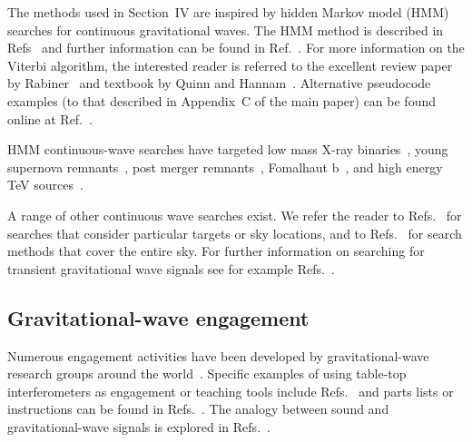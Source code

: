 \documentclass[aps,pra,superscriptaddress,reprint]{revtex4-2}
\begin{document}
The methods used in Section~IV are inspired by hidden Markov model (HMM) searches for continuous gravitational waves. 
The HMM method is described in Refs~\cite{SuvorovaEtAl:2017,SuvorovaEtAl:2016,BayleyEtAlSOAP:2019,Viterbi:1967} and further information can be found in Ref.~\cite{JKS:1998}. 
For more information on the Viterbi algorithm, the interested reader is referred to the excellent review paper by Rabiner~\cite{Rabiner:1989} and textbook by Quinn and Hannam~\cite{QuinnEtAl:2001}. 
Alternative pseudocode examples (to that described in Appendix~C of the main paper) can be found online at Ref.~\cite{viterbipseudocode:online}.

HMM continuous-wave searches have targeted low mass X-ray binaries~\cite{ScoX1O2Viterbi:2019, ScoX1ViterbiO1:2017,MiddletonEtAlO2LMXBs:2020}, young supernova remnants~\cite{SNRO3a:2021,MillhouseStrangMelatos:2020,SunEtAlSNR:2018}, post merger remnants~\cite{PostMergerRemnantSearch:2019}, Fomalhaut b~\cite{JonesSun:2020}, and high energy TeV sources~\cite{BeniwalEtAl:2021}.

A range of other continuous wave searches exist. 
We refer the reader to Refs.~\cite{MSPSearchO3O2O1:2020, RadiometerO1O2:2019, SearchRadiometerO1:2017, KnownPulsarsO2:2019, SearchCrossCorrO1:2017, SearchTwoSpecS6:2017, VirgoCrabVelaSearch:2015, StackSlide:2012} for searches that consider particular targets or sky locations, and to Refs.~\cite{UnknownNSSearchO3a:2021, EinsteinAtHomeO2:2021, StackSlide:2012} for search methods that cover the entire sky. 
For further information on searching for transient gravitational wave signals see for example Refs.~\cite{SuvorovaPowellMelatos:2019, MillhouseEtAl:2018, Mohanty:2017, AddessoEtAl:2016, ThraneCoughlin:2014, ThraneEtAl:2011, CandesEtAl:2008, ChassandeMottinArchana:2006, AndersonBalasubramanian:1999}.


\subsection{Gravitational-wave engagement}
Numerous engagement activities have been developed by gravitational-wave research groups around the world~\cite{TTExhibit:2021,CavagliaExhibit:2009, LIGOScienceEducationCentre:online, GravityDiscoveryCentre:online, GWOSC:online, LOSC:2015, LaserLabs:online, SciVR:online, chirp:online, BlackHoleHunter:online, ArthurJeffesMusic:online, GravitySynthLeonTrimble:online}. 
Specific examples of using table-top interferometers as engagement or teaching tools include Refs.~\cite{TTExhibit:2021,UgoliniEtAl:2019,LibbrechtBlack:2015,AMIGO:online,FoxEtAl:1999} and parts lists or instructions can be found in Refs.~\cite{TTExhibit:online,LIGOIFOGlue,LIGOIFOMagnets,NikhefIFO,ThorLabsIFO}. 
The analogy between sound and gravitational-wave signals is explored in Refs.~\cite{SoundsOfSpaceTime:online,BlackHoleHunter:online}.
\end{document}
